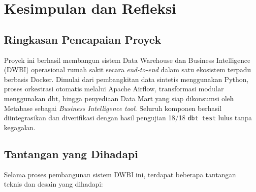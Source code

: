 
 
\chapter{Kesimpulan dan Refleksi}
 
\section{Ringkasan Pencapaian Proyek}
 
Proyek ini berhasil membangun sistem Data Warehouse dan Business Intelligence (DWBI) operasional rumah sakit secara \textit{end-to-end} dalam satu ekosistem terpadu berbasis Docker. Dimulai dari pembangkitan data sintetis menggunakan Python, proses orkestrasi otomatis melalui Apache Airflow, transformasi modular menggunakan dbt, hingga penyediaan Data Mart yang siap dikonsumsi oleh Metabase sebagai \textit{Business Intelligence tool}. Seluruh komponen berhasil diintegrasikan dan diverifikasi dengan hasil pengujian 18/18 \texttt{dbt test} lulus tanpa kegagalan.
 
\section{Tantangan yang Dihadapi}
 
Selama proses pembangunan sistem DWBI ini, terdapat beberapa tantangan teknis dan desain yang dihadapi:
 
